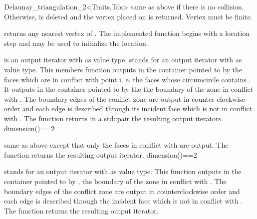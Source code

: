 \begin{ccRefClass}{Delaunay_triangulation_2<Traits,Tds>}
{same as above if there is no collision. Otherwise, 
is deleted and the vertex placed on  is returned.
 \ccPrecond Vertex  must be finite.}


{returns any nearest vertex of . The implemented function
begins with a location step and
 may be used to initialize the location.}

{  is an output iterator with  as value type.
 stands for an output iterator with  as value type.
This members function outputs in the container pointed to by 
the faces which are in conflict with point 
i. e. the faces whose circumcircle contains .
It outputs in the container pointed to by  the 
the boundary of the zone in conflict with .
The boundary edges
of the conflict  zone are output in counter-clockwise order
and each edge is described  through its incident face
which is not in conflict with .
The function returns in a std::pair the resulting output iterators.
\ccPrecond dimension()==2}

{same as above except that only the faces in conflict with 
are output. The function returns the resulting output iterator.
\ccPrecond dimension()==2}

{  stands for an output iterator with 
 as value
type.
 This function  outputs in the container pointed to by ,
the boundary of the zone in conflict with . The boundary edges
of the conflict  zone are output in counterclockwise order
and each edge is described  through the incident face
which is not in conflict with .
The function returns the resulting output iterator.}



\end{ccRefClass}
